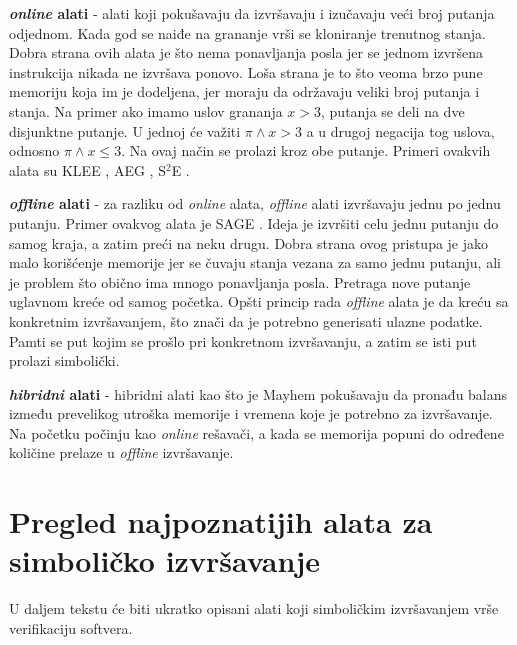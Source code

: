 \documentclass[12pt,oneside]{memoir}
\begin{document}
\begin{description}
    \item \textbf{\textit{online} alati} - alati koji pokušavaju da izvršavaju i izučavaju veći broj putanja odjednom. Kada god se naiđe na grananje vrši se kloniranje trenutnog stanja. Dobra strana ovih alata je što nema ponavljanja posla jer se jednom izvršena instrukcija nikada ne izvršava ponovo. Loša strana je to što veoma brzo pune memoriju koja im je dodeljena, jer moraju da održavaju veliki broj putanja i stanja. Na primer ako imamo uslov grananja $x > 3$, putanja se deli na dve disjunktne putanje. U jednoj će važiti $\pi \land x > 3$ a u drugoj negacija tog uslova, odnosno $\pi \land x \leq 3$. Na ovaj način se prolazi kroz obe putanje. Primeri ovakvih alata su KLEE \cite{klee}, AEG \cite{aeg}, S$^2$E \cite{s2e}.
    
    \item \textbf{\textit{offline} alati} - za razliku od \textit{online} alata, \textit{offline} alati izvršavaju jednu po jednu putanju. Primer ovakvog alata je SAGE \cite{sage}. Ideja je izvršiti celu jednu putanju do samog kraja, a zatim preći na neku drugu. Dobra strana ovog pristupa je jako malo korišćenje memorije jer se čuvaju stanja vezana za samo jednu putanju, ali je problem što obično ima mnogo ponavljanja posla. Pretraga nove putanje uglavnom kreće od samog početka. Opšti princip rada \textit{offline} alata je da kreću sa konkretnim izvršavanjem, što znači da je potrebno generisati ulazne podatke. Pamti se put kojim se prošlo pri konkretnom izvršavanju, a zatim se isti put prolazi simbolički. 
    
    \item \textbf{\textit{hibridni} alati} - hibridni alati kao što je Mayhem \cite{mayhem} pokušavaju da pronađu balans između prevelikog utroška memorije i vremena koje je potrebno za izvršavanje. Na početku počinju kao \textit{online} rešavači, a kada se memorija popuni do određene količine prelaze u \textit{offline} izvršavanje.
\end{description}

\section{Pregled najpoznatijih alata za simboličko izvršavanje} \label{alati_za_simbolicko}

U daljem tekstu će biti ukratko opisani alati koji simboličkim izvršavanjem vrše verifikaciju softvera.
\end{document}
